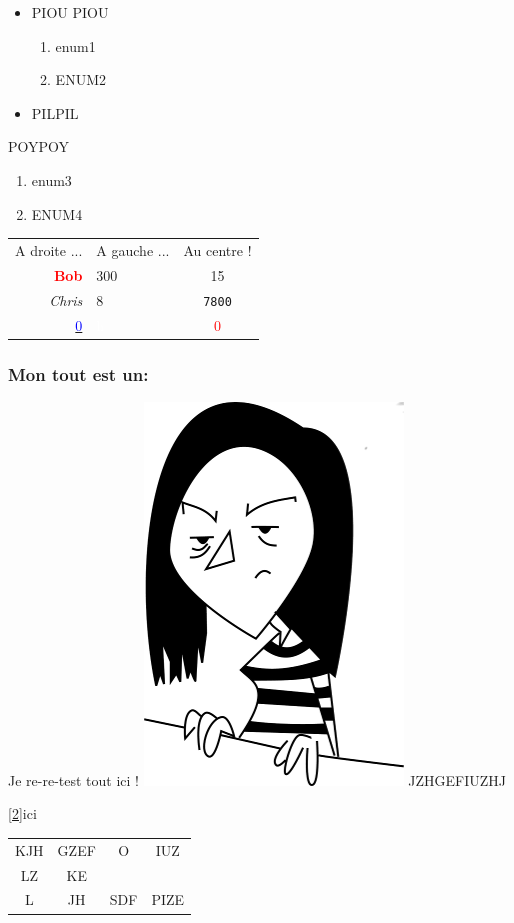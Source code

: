 \documentclass[10pt,a4paper]{report}
\begin{document}
\begin{itemize}
\item PIOU PIOU
\begin{enumerate}
\item enum1
\item ENUM2
\end{enumerate}
\item PILPIL
\end{itemize}

POYPOY
\begin{enumerate}
\item enum3
\item ENUM4
\end{enumerate}
\begin{tabular}{rlc}
A droite ... & A gauche ... & Au centre ! \\
{\bf \textcolor{red}{Bob}} & 300 & 15 \\
{\itshape Chris} & 8 & \texttt{7800} \\
\underline{ \textcolor{blue}{0}} & \textcolor{white}{h} & \textcolor{red}{0} \\
\end{tabular}



\subsubsection{Mon tout est un:}
Je re-re-test tout ici !
\includegraphics{Mini_Amel.png}
JZHGEFIUZHJ

\jambon

\ref{2}{ici}

\begin{tabular}{cccc}
KJH & GZEF & O & IUZ \\
LZ & KE & & \\
L & JH & SDF & PIZE \\
\end{tabular}
\end{document}
